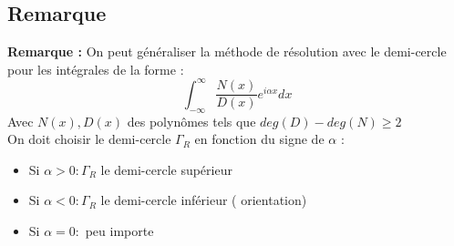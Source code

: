 \subsection{Remarque}
\textbf{Remarque :} On peut généraliser la méthode de résolution avec le demi-cercle pour les intégrales de la forme : 
$$\int_{-\infty}^{\infty}\frac{N(x)}{D(x)}e^{i\alpha x} dx$$
Avec $N(x), D(x)$ des polynômes tels que $deg(D)-deg(N) \geq 2$ \\
On doit choisir le demi-cercle $\Gamma_R$ en fonction du signe de $\alpha$ :
\begin{itemize}
    \item Si $\alpha > 0 : \Gamma_R$ le demi-cercle supérieur
    \item Si $\alpha < 0 : \Gamma_R$ le demi-cercle inférieur (\faExclamationTriangle\hspace{1pt} orientation)
    \item Si $\alpha = 0 :$ peu importe
\end{itemize}